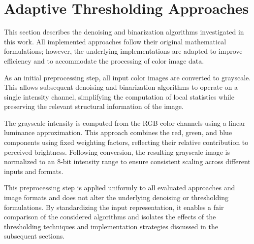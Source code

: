 \section{Adaptive Thresholding Approaches} \label{sec:ATA}

This section describes the denoising and binarization algorithms investigated in this work.
All implemented approaches follow their original mathematical formulations; however, the underlying implementations are adapted to improve efficiency and to accommodate the processing of color image data.

As an initial preprocessing step, all input color images are converted to grayscale. 
This allows subsequent denoising and binarization algorithms to operate on a single intensity channel, simplifying the computation of local statistics while preserving the relevant structural information of the image.

The grayscale intensity is computed from the RGB color channels using a linear luminance approximation. 
This approach combines the red, green, and blue components using fixed weighting factors, reflecting their relative contribution to perceived brightness.
Following conversion, the resulting grayscale image is normalized to an 8-bit intensity range to ensure consistent scaling across different inputs and formats.

This preprocessing step is applied uniformly to all evaluated approaches and image formats and does not alter the underlying denoising or thresholding formulations.
By standardizing the input representation, it enables a fair comparison of the considered algorithms and isolates the effects of the thresholding techniques and implementation strategies discussed in the subsequent sections.

